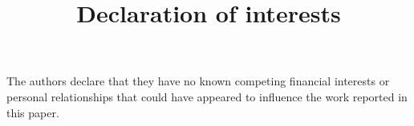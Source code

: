 \documentclass[a4paper,12pt]{extarticle}
\title{Declaration of interests}
\begin{document}
\maketitle

The authors declare that they have no known competing financial interests or personal relationships that could have appeared to influence the work reported in this paper.
\end{document}
